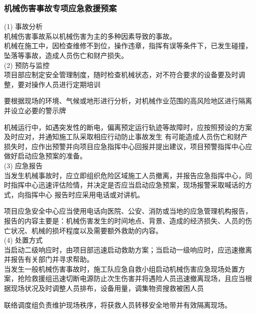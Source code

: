 \subsubsection{机械伤害事故专项应急救援预案}

(1) 事故分析\\

机械伤害事故系以机械伤害为主的多种因素导致的事故。\\

机械在施工中，因检查维修不到位，操作违章，指挥有误等条件下，已发生碰撞，坠落等事故，造成人员伤亡和财产损失。\\

(2) 预防与监控\\

 项目部应制定安全管理制度，随时检查机械状态，对不符合要求的设备要及时调整，要对操作人员进行定期培训

 要根据现场的环境、气候或地形进行分析，对机械作业范围的高风险地区进行隔离并设立必要的警示牌

 机械运行中，如遇突发性的断电，偏离预定运行轨迹等故障时，应按照预设的方案及时应对，并通知施工队采取相应行动防止事故发生
有可能造成人员伤亡和财产损失时，应作出预警并向项目应急指挥中心回报并提出建议，项目预警指挥中心应做好启动应急预案的准备。\\

(3) 应急报告\\

当发生机械事故时，应立即组织危险区域施工人员撤离，并报告应急指挥中心，同时指挥中心迅速评估险情，并决定是否应当启动应急预案，现场报警采取喊话的方式，向指挥中心
报告时应采用电话或对讲机。

项目应急安全中心应当使用电话向医院、公安、消防或当地的应急管理机构报告，报告的内容主要是：机械伤害发生的时间地点、背景、造成的经济损失、人员的伤亡状况、机械的损坏程度以及需要额外救助的内容。\\

(4) 处置方式\\

当启动二级响应时，由项目部迅速启动救助方案；当启动一级响应时，应迅速撤离并报告有关部门并寻求帮助。\\

当发生一般机械伤害事故时，施工队应急自救小组启动机械伤害应急现场处置方案，抢险救援组迅速切断电源防止次生伤害并将遇险人员迅速撤离现场，且应当根据现场状况及时调整人员排布，设备用量，调集物资搜救被困人员

联络调度组负责维护现场秩序，将获救人员转移安全地带并有效隔离现场。

